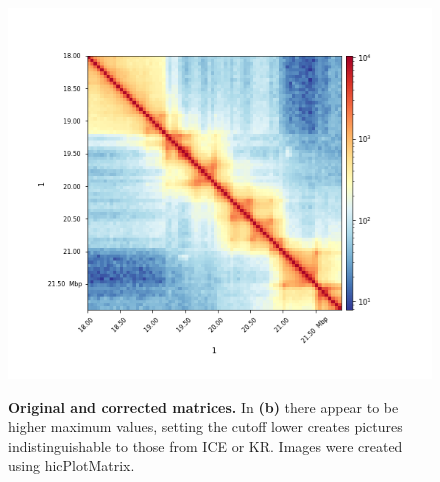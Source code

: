 \begin{figure}[!htbp]
\begin{centering}
{            \includegraphics[scale=0.4]{figures/results/c_ice_50kb}}
        \caption[Plotting corrected matrices]
        {\textbf{Original and corrected matrices.} In \textbf{(b)} there appear to be
        higher maximum values, setting the cutoff lower creates pictures
        indistinguishable to those from ICE or KR.
        Images were created using hicPlotMatrix.
        }
        \label{fig:plotted}
    \end{centering}
\end{figure}
